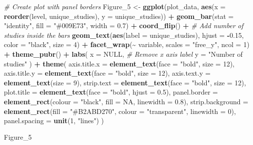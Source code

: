 \documentclass[
]{article}
\newenvironment{Shaded}{\begin{snugshade}}{\end{snugshade}}
\newcommand{\AttributeTok}[1]{\textcolor[rgb]{0.13,0.29,0.53}{#1}}
\newcommand{\CommentTok}[1]{\textcolor[rgb]{0.56,0.35,0.01}{\textit{#1}}}
\newcommand{\ConstantTok}[1]{\textcolor[rgb]{0.56,0.35,0.01}{#1}}
\newcommand{\DecValTok}[1]{\textcolor[rgb]{0.00,0.00,0.81}{#1}}
\newcommand{\FloatTok}[1]{\textcolor[rgb]{0.00,0.00,0.81}{#1}}
\newcommand{\FunctionTok}[1]{\textcolor[rgb]{0.13,0.29,0.53}{\textbf{#1}}}
\newcommand{\NormalTok}[1]{#1}
\newcommand{\OtherTok}[1]{\textcolor[rgb]{0.56,0.35,0.01}{#1}}
\newcommand{\SpecialCharTok}[1]{\textcolor[rgb]{0.81,0.36,0.00}{\textbf{#1}}}
\newcommand{\StringTok}[1]{\textcolor[rgb]{0.31,0.60,0.02}{#1}}
\begin{document}
\begin{Shaded}
\begin{Highlighting}[]
\CommentTok{\# Create plot with panel borders}
\NormalTok{Figure\_5 }\OtherTok{\textless{}{-}} 
  \FunctionTok{ggplot}\NormalTok{(plot\_data, }\FunctionTok{aes}\NormalTok{(}\AttributeTok{x =} \FunctionTok{reorder}\NormalTok{(level, unique\_studies), }\AttributeTok{y =}\NormalTok{ unique\_studies)) }\SpecialCharTok{+}
  \FunctionTok{geom\_bar}\NormalTok{(}\AttributeTok{stat =} \StringTok{"identity"}\NormalTok{, }\AttributeTok{fill =} \StringTok{"\#009E73"}\NormalTok{, }\AttributeTok{width =} \FloatTok{0.7}\NormalTok{) }\SpecialCharTok{+}
  \FunctionTok{coord\_flip}\NormalTok{() }\SpecialCharTok{+}
  \CommentTok{\# Add number of studies inside the bars}
  \FunctionTok{geom\_text}\NormalTok{(}\FunctionTok{aes}\NormalTok{(}\AttributeTok{label =}\NormalTok{ unique\_studies), }
            \AttributeTok{hjust =} \SpecialCharTok{{-}}\FloatTok{0.15}\NormalTok{, }\AttributeTok{color =} \StringTok{"black"}\NormalTok{, }\AttributeTok{size =} \DecValTok{4}\NormalTok{) }\SpecialCharTok{+}
  \FunctionTok{facet\_wrap}\NormalTok{(}\SpecialCharTok{\textasciitilde{}}\NormalTok{ variable, }\AttributeTok{scales =} \StringTok{"free\_y"}\NormalTok{, }\AttributeTok{ncol =} \DecValTok{1}\NormalTok{) }\SpecialCharTok{+}
  \FunctionTok{theme\_pubr}\NormalTok{() }\SpecialCharTok{+}
  \FunctionTok{labs}\NormalTok{(}
     \AttributeTok{x =} \ConstantTok{NULL}\NormalTok{,  }\CommentTok{\# Remove x axis label}
    \AttributeTok{y =} \StringTok{"Number of studies"}
\NormalTok{  ) }\SpecialCharTok{+}
 \FunctionTok{theme}\NormalTok{(}
    \AttributeTok{axis.title.x =} \FunctionTok{element\_text}\NormalTok{(}\AttributeTok{face =} \StringTok{"bold"}\NormalTok{, }\AttributeTok{size =} \DecValTok{12}\NormalTok{),}
    \AttributeTok{axis.title.y =} \FunctionTok{element\_text}\NormalTok{(}\AttributeTok{face =} \StringTok{"bold"}\NormalTok{, }\AttributeTok{size =} \DecValTok{12}\NormalTok{),}
    \AttributeTok{axis.text.y =} \FunctionTok{element\_text}\NormalTok{(}\AttributeTok{size =} \DecValTok{9}\NormalTok{),}
    \AttributeTok{strip.text =} \FunctionTok{element\_text}\NormalTok{(}\AttributeTok{face =} \StringTok{"bold"}\NormalTok{, }\AttributeTok{size =} \DecValTok{12}\NormalTok{),}
    \AttributeTok{plot.title =} \FunctionTok{element\_text}\NormalTok{(}\AttributeTok{face =} \StringTok{"bold"}\NormalTok{, }\AttributeTok{hjust =} \FloatTok{0.5}\NormalTok{),}
    \AttributeTok{panel.border =} \FunctionTok{element\_rect}\NormalTok{(}\AttributeTok{colour =} \StringTok{"black"}\NormalTok{, }\AttributeTok{fill =} \ConstantTok{NA}\NormalTok{, }\AttributeTok{linewidth =} \FloatTok{0.8}\NormalTok{),}
    \AttributeTok{strip.background =} \FunctionTok{element\_rect}\NormalTok{(}\AttributeTok{fill =} \StringTok{"\#B2ABD270"}\NormalTok{, }\AttributeTok{colour =} \StringTok{"transparent"}\NormalTok{, }\AttributeTok{linewidth =} \DecValTok{0}\NormalTok{),}
    \AttributeTok{panel.spacing =} \FunctionTok{unit}\NormalTok{(}\DecValTok{1}\NormalTok{, }\StringTok{"lines"}\NormalTok{)}
\NormalTok{  )}

\NormalTok{Figure\_5}
\end{Highlighting}
\end{Shaded}
\end{document}
